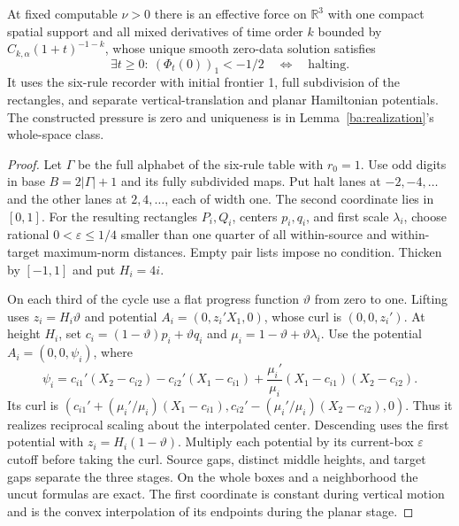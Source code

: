 \begin{theorem}
\label{ba:phasewise-flow}
At fixed computable $\nu>0$ there is an effective force on $\mathbb R^3$
with one compact spatial support and all mixed derivatives of time order
$k$ bounded by $C_{k,\alpha}(1+t)^{-1-k}$, whose unique smooth
zero-data solution satisfies
\[
 \exists t\ge0:\ (\Phi_t(0))_1<-1/2
 \quad\Longleftrightarrow\quad\text{halting}.
\]
It uses the six-rule recorder with initial frontier 1, full subdivision
of the rectangles, and separate vertical-translation and planar
Hamiltonian potentials.  The constructed pressure is zero and uniqueness
is in Lemma~\ref{ba:realization}'s whole-space class.
\end{theorem}
\begin{proof}\label{ba:phasewise-flow-proof}
Let $\Gamma$ be the full alphabet of the six-rule table with $r_0=1$.
Use odd digits in base $B=2|\Gamma|+1$ and its fully subdivided maps.  Put halt lanes at $-2,-4,\ldots$
and the other lanes at $2,4,\ldots$, each of width one.  The second
coordinate lies in $[0,1]$.  For the resulting rectangles $P_i,Q_i$,
centers $p_i,q_i$, and first scale $\lambda_i$, choose rational
$0<\varepsilon\le1/4$ smaller than one quarter of all within-source
and within-target maximum-norm distances.  Empty pair lists impose no
condition.  Thicken by $[-1,1]$ and put $H_i=4i$.

On each third of the cycle use a flat progress function $\vartheta$
from zero to one.  Lifting uses $z_i=H_i\vartheta$ and potential
$A_i=(0,z_i'X_1,0)$, whose curl is $(0,0,z_i')$.
At height $H_i$, set $c_i=(1-\vartheta)p_i+\vartheta q_i$ and
$\mu_i=1-\vartheta+\vartheta\lambda_i$.  Use the potential
$A_i=(0,0,\psi_i)$, where
\[
 \psi_i=c_{i1}'(X_2-c_{i2})-c_{i2}'(X_1-c_{i1})
       +\frac{\mu_i'}{\mu_i}(X_1-c_{i1})(X_2-c_{i2}).
\]
Its curl is
$(c_{i1}'+(\mu_i'/\mu_i)(X_1-c_{i1}),
 c_{i2}'-(\mu_i'/\mu_i)(X_2-c_{i2}),0)$.
Thus it realizes reciprocal scaling about the interpolated center.
Descending uses the first potential with $z_i=H_i(1-\vartheta)$.
Multiply each potential by its current-box $\varepsilon$ cutoff
before taking the curl.  Source gaps, distinct middle heights, and
target gaps separate the three stages.  On the whole boxes and a
neighborhood the uncut formulas are exact.  The first coordinate is
constant during vertical motion and is the convex interpolation of its
endpoints during the planar stage.


\end{proof}
